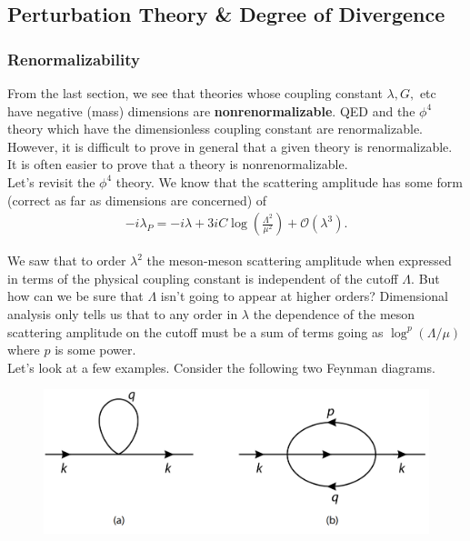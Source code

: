 \documentclass{book}
\theoremstyle{definition}
\newcommand{\f}[2]{\frac{#1}{#2}}
\newcommand{\lp}{\left(}
\newcommand{\rp}{\right)}
\begin{document}
\newpage

\subsection{Perturbation Theory \& Degree of Divergence}




\subsubsection{Renormalizability}


From the last section, we see that theories whose coupling constant $\lambda, G,$ etc have negative (mass) dimensions are \textbf{nonrenormalizable}. QED and the $\phi^4$ theory which have the dimensionless coupling constant are renormalizable. However, it is difficult to prove in general that a given theory is renormalizable. It is often easier to prove that a theory is nonrenormalizable. \\


Let's revisit the $\phi^4$ theory. We know that the scattering amplitude has some form (correct as far as dimensions are concerned) of
\begin{align}
-i\lambda_P = -i\lambda + 3iC \log \lp \f{\Lambda^2}{\mu^2} \rp + \mathcal{O}(\lambda^3).
\end{align}


We saw that to order $\lambda^2$ the meson-meson scattering amplitude when expressed in terms of the physical coupling constant is independent of the cutoff $\Lambda$. But how can we be sure that $\Lambda$ isn't going to appear at higher orders? Dimensional analysis only tells us that to any order in $\lambda$ the dependence of the meson scattering amplitude on the cutoff must be a sum of terms going as $\log^p(\Lambda/\mu)$ where $p$ is some power. \\

Let's look at a few examples. Consider the following two Feynman diagrams.
\begin{figure}[!htb]
	\centering
	\includegraphics[scale=0.3]{mesons-phi-4}
\end{figure}
\end{document}
